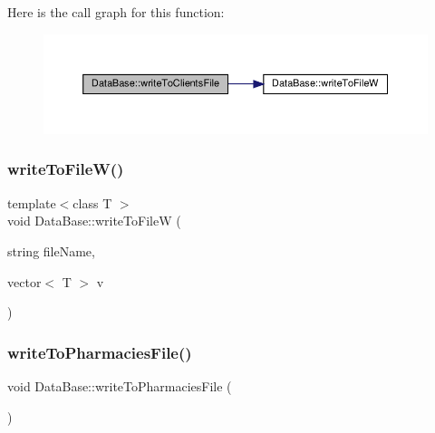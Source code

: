 Here is the call graph for this function\+:\nopagebreak
\begin{figure}[H]
\begin{center}
\leavevmode
\includegraphics[width=350pt]{classDataBase_a4d855ccf967f4f741646100d2c890ede_cgraph}
\end{center}
\end{figure}
\mbox{\label{classDataBase_a136d789db1f6c1cd615dc1bdbe27557b}} 
\subsubsection{\texorpdfstring{write\+To\+File\+W()}{writeToFileW()}}
{\footnotesize\ttfamily template$<$class T $>$ \\
void Data\+Base\+::write\+To\+FileW (\begin{DoxyParamCaption}\item[{string}]{file\+Name,  }\item[{vector$<$ T $>$}]{v }\end{DoxyParamCaption})\hspace{0.3cm}{\ttfamily [inline]}}

\mbox{\label{classDataBase_aef0dc00d9d40159c361518e60e78f857}} 
\subsubsection{\texorpdfstring{write\+To\+Pharmacies\+File()}{writeToPharmaciesFile()}}
{\footnotesize\ttfamily void Data\+Base\+::write\+To\+Pharmacies\+File (\begin{DoxyParamCaption}{ }\end{DoxyParamCaption})}

